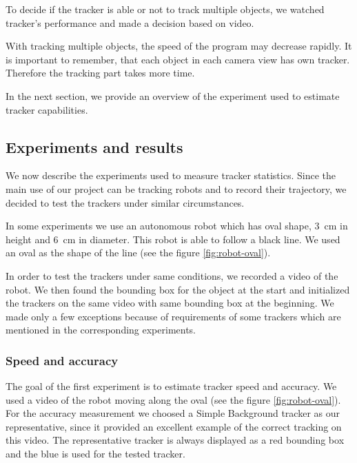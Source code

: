 To decide if the tracker is able or not to track multiple objects, we watched
tracker's performance and made a decision based on video.

With tracking multiple objects, the speed of the program may decrease rapidly.
It is important to remember, that each object in each camera view has own
tracker. Therefore the tracking part takes more time.

In the next section, we provide an overview of the experiment used to estimate
tracker capabilities.


\subsection{Experiments and results}

We now describe the experiments used to measure tracker statistics. Since the
main use of our project can be tracking robots and to record their trajectory,
we decided to test the trackers under similar circumstances.

In some experiments we use an autonomous robot which has oval shape, 3~cm
in height and 6~cm in diameter. This robot is able to follow a black line.
We used an oval as the shape of the line (see the figure \ref{fig:robot-oval}).

In order to test the trackers under same conditions, we recorded a video of the
robot. We then found the bounding box for the object at the start and
initialized the trackers on the same video with same bounding box at the
beginning. We made only a few exceptions because of requirements of some
trackers which are mentioned in the corresponding experiments.

\subsubsection{Speed and accuracy}

The goal of the first experiment is to estimate tracker speed and accuracy. We
used a video of the robot moving along the oval (see the figure
\ref{fig:robot-oval}). For the accuracy measurement we choosed a Simple
Background tracker as our representative, since it provided an excellent
example of the correct tracking on this video. The representative tracker is
always displayed as a red bounding box and the blue is used for the tested
tracker.

